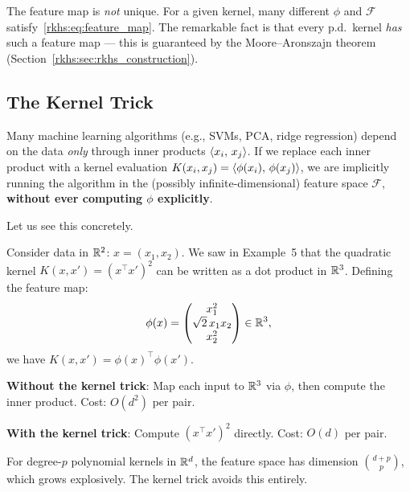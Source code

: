 \begin{notechapter}
The feature map is \emph{not} unique. For a given kernel, many different
$\phi$ and $\mathcal{F}$ satisfy~\eqref{rkhs:eq:feature_map}. The remarkable
fact is that every p.d.\ kernel \emph{has} such a feature map --- this
is guaranteed by the Moore--Aronszajn theorem
(Section~\ref{rkhs:sec:rkhs_construction}).

\subsection{The Kernel Trick}
\label{rkhs:subsec:kernel_trick}

\begin{insightbox}
Many machine learning algorithms (e.g., SVMs, PCA, ridge regression)
depend on the data \emph{only} through inner products
$\langle x_i,\, x_j \rangle$. If we replace each inner product with a kernel
evaluation $K(x_i, x_j) = \langle \phi(x_i),\, \phi(x_j) \rangle$, we are
implicitly running the algorithm in the (possibly infinite-dimensional)
feature space $\mathcal{F}$, \textbf{without ever computing $\phi$
explicitly}.
\end{insightbox}

Let us see this concretely.

\begin{examplebox}
Consider data in $\mathbb{R}^2$: $x = (x_1, x_2)$. We saw in
Example~5 that the quadratic kernel
$K(x,x') = (x^\top x')^2$ can be written as a dot
product in $\mathbb{R}^3$. Defining the feature map:
\[
\phi(x) = \begin{pmatrix} x_1^2 \\
\sqrt{2}\,x_1 x_2 \\ x_2^2
\end{pmatrix} \in \mathbb{R}^3,
\]
we have
$K(x,x') = \phi(x)^\top \phi(x')$.

\textbf{Without the kernel trick}: Map each input to
$\mathbb{R}^3$ via $\phi$, then compute the inner product.
Cost: $O(d^2)$ per pair.

\textbf{With the kernel trick}: Compute $(x^\top x')^2$
directly. Cost: $O(d)$ per pair.

For degree-$p$ polynomial kernels in $\mathbb{R}^d$, the
feature space has dimension $\binom{d+p}{p}$, which
grows explosively. The kernel trick avoids this
entirely.
\end{examplebox}

\begin{figure}[ht]
\centering
{}
\end{figure}
\end{notechapter}
